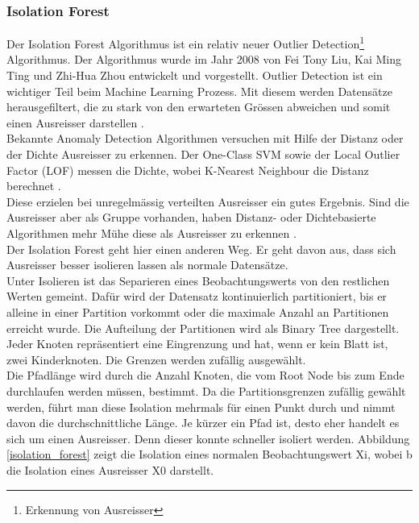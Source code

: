 \subsubsection{Isolation Forest}
Der Isolation Forest Algorithmus ist ein relativ neuer Outlier Detection\footnote{Erkennung von Ausreisser} Algorithmus. Der Algorithmus wurde im Jahr 2008 von Fei Tony Liu, Kai Ming Ting und Zhi-Hua Zhou entwickelt und vorgestellt. Outlier Detection ist ein wichtiger Teil beim Machine Learning Prozess. Mit diesem werden Datensätze herausgefiltert, die zu stark von den erwarteten Grössen abweichen und somit einen Ausreisser darstellen \cite{isolation_forest_1}.\\
Bekannte Anomaly Detection Algorithmen versuchen mit Hilfe der Distanz oder der Dichte Ausreisser zu erkennen. Der One-Class SVM sowie der Local Outlier Factor (LOF) messen die Dichte, wobei K-Nearest Neighbour die Distanz berechnet \cite{isolation_forest_2}.\\
Diese erzielen bei unregelmässig verteilten Ausreisser ein gutes Ergebnis. Sind die Ausreisser aber als Gruppe vorhanden, haben Distanz- oder Dichtebasierte Algorithmen mehr Mühe diese als Ausreisser zu erkennen \cite{isolation_forest_3}.\\[2ex]
%
Der Isolation Forest geht hier einen anderen Weg. Er geht davon aus, dass sich Ausreisser besser isolieren lassen als normale Datensätze.\\
Unter Isolieren ist das Separieren eines Beobachtungswerts von den restlichen Werten gemeint. Dafür wird der Datensatz kontinuierlich partitioniert, bis er alleine in einer Partition vorkommt oder die maximale Anzahl an Partitionen erreicht wurde. Die Aufteilung der Partitionen wird als Binary Tree dargestellt. Jeder Knoten repräsentiert eine Eingrenzung und hat, wenn er kein Blatt ist, zwei Kinderknoten. Die Grenzen werden zufällig ausgewählt.\\
Die Pfadlänge wird durch die Anzahl Knoten, die vom Root Node bis zum Ende durchlaufen werden müssen, bestimmt. Da die Partitionsgrenzen zufällig gewählt werden, führt man diese Isolation mehrmals für einen Punkt durch und nimmt davon die durchschnittliche Länge. Je kürzer ein Pfad ist, desto eher handelt es sich um einen Ausreisser. Denn dieser konnte schneller isoliert werden. Abbildung \ref{isolation_forest} zeigt die Isolation  eines normalen Beobachtungswert Xi, wobei b die Isolation eines Ausreisser X0 darstellt.\\
